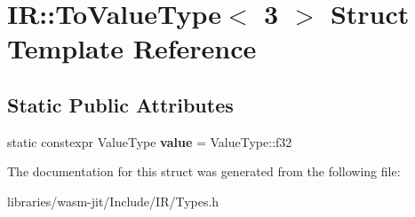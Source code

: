 \hypertarget{struct_i_r_1_1_to_value_type_3_013_01_4}{}\section{IR\+:\+:To\+Value\+Type$<$ 3 $>$ Struct Template Reference}
\label{struct_i_r_1_1_to_value_type_3_013_01_4}
\subsection*{Static Public Attributes}
\begin{DoxyCompactItemize}
\item 
\mbox{\label{struct_i_r_1_1_to_value_type_3_013_01_4_ade40bc852d1c88f6127fa160f6e47937}} 
static constexpr Value\+Type {\bfseries value} = Value\+Type\+::f32
\end{DoxyCompactItemize}


The documentation for this struct was generated from the following file\+:\begin{DoxyCompactItemize}
\item 
libraries/wasm-\/jit/\+Include/\+I\+R/Types.\+h\end{DoxyCompactItemize}
